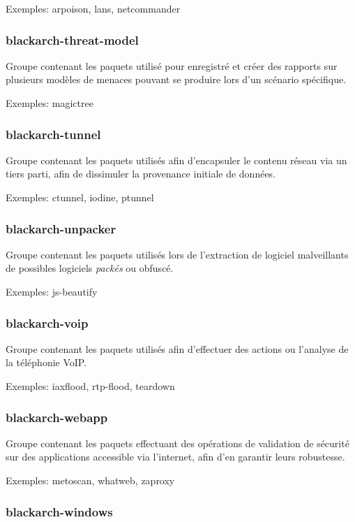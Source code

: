 \documentclass[a4paper, oneside, 11pt]{book}
\begin{document}
Exemples: arpoison, lans, netcommander

\subsubsection{blackarch-threat-model}

Groupe contenant les paquets utilisé pour enregistré et créer des rapports sur
plusieurs modèles de menaces pouvant se produire lors d'un scénario spécifique.

Exemples: magictree

\subsubsection{blackarch-tunnel}

Groupe contenant les paquets utilisés afin d'encapsuler le contenu réseau via un
tiers parti, afin de dissimuler la provenance initiale de données.

Exemples: ctunnel, iodine, ptunnel

\subsubsection{blackarch-unpacker}

Groupe contenant les paquets utilisés lors de l'extraction de logiciel
malveillants de possibles logiciels \textit{packés} ou obfuscé.

Exemples: js-beautify

\subsubsection{blackarch-voip}

Groupe contenant les paquets utilisés afin d'effectuer des actions ou l'analyse
de la téléphonie VoIP.

Exemples: iaxflood, rtp-flood, teardown

\subsubsection{blackarch-webapp}

Groupe contenant les paquets effectuant des opérations de validation de sécurité
sur des applications accessible via l'internet, afin d'en garantir leurs
robustesse.

Exemples: metoscan, whatweb, zaproxy

\subsubsection{blackarch-windows}
\end{document}
